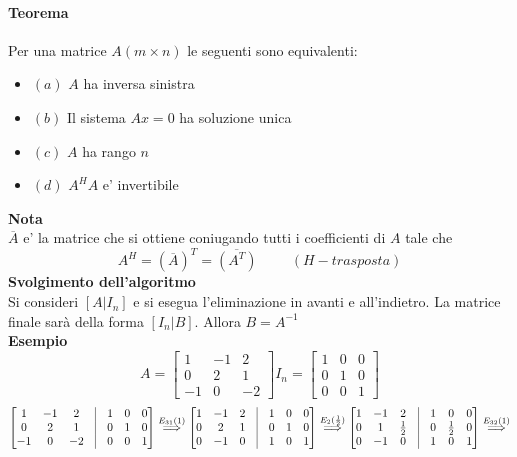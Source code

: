 \documentclass[a4paper, 10pt]{article}
\begin{document}
	\paragraph*{Teorema} Per una matrice $A (m \times n)$ le seguenti sono equivalenti:
	\begin{itemize}
		\item $(a)$ $A$ ha inversa sinistra
		\item $(b)$ Il sistema $Ax = 0$ ha soluzione unica
		\item $(c)$ $A$ ha rango $n$
		\item $(d)$ $A^{H}A$ e' invertibile
	\end{itemize}
	\textbf{Nota}\\
	$\overline{A}$ e' la matrice che si ottiene coniugando tutti i coefficienti di $A$ tale che 
	\[ A^{H} = (\overline{A})^{T} = \overline{(A^{T})} \hspace{1cm}(H-trasposta)
	\] 
	\textbf{Svolgimento dell'algoritmo}\\
	Si consideri $[A | I_{n}]$ e si esegua l'eliminazione in avanti e all'indietro. La matrice finale sarà
	della forma $[I_{n} | B]$. Allora $B = A^{-1}$\\
	\textbf{Esempio}\\
	\[
		A =
		\begin{bmatrix}
		1 & -1 & 2 \\
		0 & 2 & 1 \\
		-1 & 0 & -2
		\end{bmatrix}
		I_{n} =
		\begin{bmatrix}
		1 & 0 & 0 \\
		0 & 1 & 0 \\
		0 & 0 & 1
		\end{bmatrix}
	\]
	\[
		\begin{bmatrix}
		1 & -1 & 2 & \vrule{} & 1 & 0 & 0\\
		0 & 2 & 1 & \vrule{} & 0 & 1 & 0\\
		-1 & 0 & -2 & \vrule{} & 0 & 0 & 1
		\end{bmatrix} 
		\stackrel{E_{31}(1)}{\Longrightarrow}
		\begin{bmatrix}
		1 & -1 & 2 & \vrule{} & 1 & 0 & 0\\
		0 & 2 & 1 & \vrule{} & 0 & 1 & 0\\
		0 & -1 & 0 & \vrule{} & 1 & 0 & 1
		\end{bmatrix} 
		\stackrel{E_{2}(\frac{1}{2})}{\Longrightarrow}
		\begin{bmatrix}
		1 & -1 & 2 & \vrule{} & 1 & 0 & 0\\
		0 & 1 & \frac{1}{2} & \vrule{} & 0 & \frac{1}{2} & 0\\
		0 & -1 & 0 & \vrule{} & 1 & 0 & 1
		\end{bmatrix} 
		\stackrel{E_{32}(1)}{\Longrightarrow}
	\]
\end{document}

